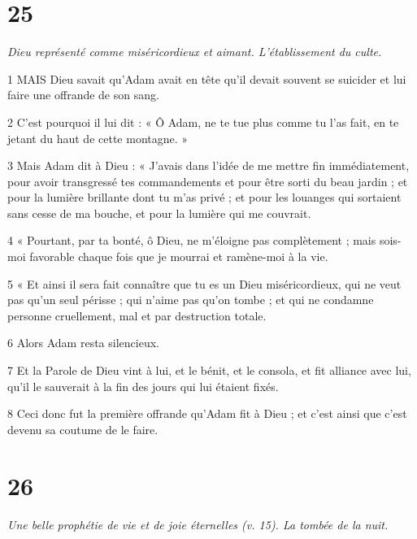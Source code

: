 \chapter{25}

\par \textit{Dieu représenté comme miséricordieux et aimant. L'établissement du culte.}

\par 1 MAIS Dieu savait qu'Adam avait en tête qu'il devait souvent se suicider et lui faire une offrande de son sang.

\par 2 C'est pourquoi il lui dit : « Ô Adam, ne te tue plus comme tu l'as fait, en te jetant du haut de cette montagne. »

\par 3 Mais Adam dit à Dieu : « J'avais dans l'idée de me mettre fin immédiatement, pour avoir transgressé tes commandements et pour être sorti du beau jardin ; et pour la lumière brillante dont tu m'as privé ; et pour les louanges qui sortaient sans cesse de ma bouche, et pour la lumière qui me couvrait.

\par 4 « Pourtant, par ta bonté, ô Dieu, ne m'éloigne pas complètement ; mais sois-moi favorable chaque fois que je mourrai et ramène-moi à la vie.

\par 5 « Et ainsi il sera fait connaître que tu es un Dieu miséricordieux, qui ne veut pas qu'un seul périsse ; qui n'aime pas qu'on tombe ; et qui ne condamne personne cruellement, mal et par destruction totale.

\par 6 Alors Adam resta silencieux.

\par 7 Et la Parole de Dieu vint à lui, et le bénit, et le consola, et fit alliance avec lui, qu'il le sauverait à la fin des jours qui lui étaient fixés.

\par 8 Ceci donc fut la première offrande qu'Adam fit à Dieu ; et c'est ainsi que c'est devenu sa coutume de le faire.

\chapter{26}

\par \textit{Une belle prophétie de vie et de joie éternelles (v. 15). La tombée de la nuit.}

